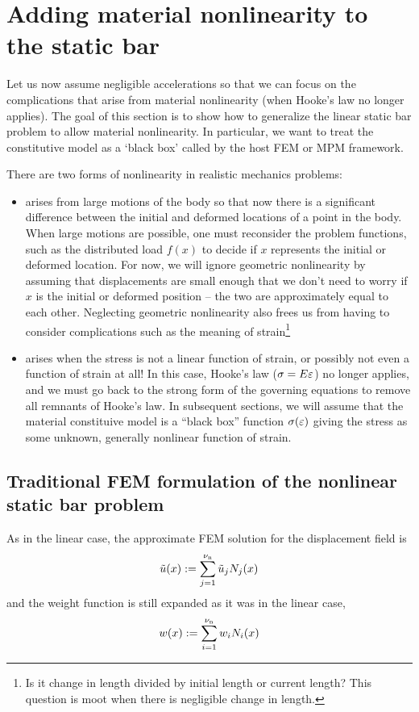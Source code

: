 
\section{Adding material nonlinearity to the \oneD static bar}
Let us now assume negligible accelerations so that we can focus on the complications that arise from material nonlinearity (\ie when Hooke's law no longer applies).
The goal of this section is to show how to generalize the linear static bar problem to allow material nonlinearity.  In particular, we want to treat the constitutive model as a `black box' called by the host FEM or MPM framework.


There are two forms of nonlinearity in realistic mechanics problems: 
\begin{itemize}
  \item {} arises from large motions of the body so that now there is a significant difference between the initial and deformed locations of a point in the body. When large motions are possible, one must reconsider the problem functions, such as the distributed load $f(x)$ to decide if $x$ represents the initial or deformed location. For now, we will ignore geometric nonlinearity by assuming that displacements are small enough that we don't need to worry if $x$ is the initial or deformed position -- the two are approximately equal to each other. Neglecting geometric nonlinearity also frees us from having to consider complications such as the meaning of strain\footnote{Is it change in length divided by initial length or current length? This question is moot when there is negligible change in length.}
  \item {} arises when the stress is not a linear function of strain, or possibly not even a function of strain at all! In this case, Hooke's law (${\sigma}=E{\varepsilon}$) no longer applies, and we must go back to the strong form of the governing equations to remove all remnants of Hooke's law. In subsequent sections, we will assume that the material constituive model is a ``black box'' function ${\sigma}({\varepsilon})$ giving the stress as some unknown, generally nonlinear function of strain.
\end{itemize}



\subsection{Traditional FEM formulation of the nonlinear static bar problem}
\label{sec:nonLinearBarFEM}
As in the linear case, the approximate FEM solution for the displacement field is
\begin{equation}
  \tilde{u}(x):=\sum\limits_{j=1}^{{\nu_\text{n}}}\tilde{u}_j {N}_j(x)
\label{eq:nonLinaprxuc}
\end{equation}
and the weight function is still expanded as it was in the linear case,
\begin{equation}
  w(x):=\sum\limits_{i=1}^{{\nu_\text{n}}}w_i {N}_i(x)
\label{eq:nonLinweightc}
\end{equation}

